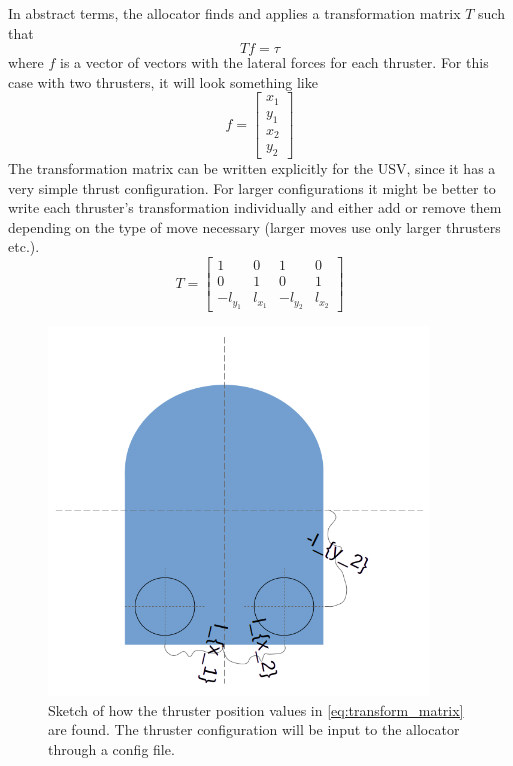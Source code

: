 \documentclass[class=article, crop=false, draft=true]{standalone}
\begin{document}
In abstract terms, the allocator finds and applies a transformation matrix \(T\) such that \[Tf = \tau\] where \(f\) is a vector of vectors with the lateral forces for each thruster. For this case with two thrusters, it will look something like \[f = \begin{bmatrix}x_1 \\ y_1 \\ x_2 \\ y_2 \end{bmatrix}\]
The transformation matrix can be written explicitly for the USV, since it has a very simple thrust configuration. For larger configurations it might be better to write each thruster's transformation individually and either add or remove them depending on the type of move necessary (larger moves use only larger thrusters etc.).
\begin{equation}\label{eq:transform_matrix}
T = \begin{bmatrix}1 & 0 & 1 & 0 \\ 0 & 1 & 0 & 1 \\ -l_{y_1} & l_{x_1} & -l_{y_2} & l_{x_2}\end{bmatrix}
\end{equation}

\begin{figure}
    \centering
    \includegraphics[width=0.9\textwidth]{thruster_position_sketch}
    \caption{Sketch of how the thruster position values in \cref{eq:transform_matrix} are found. The thruster configuration will be input to the allocator through a config file.}
    \label{fig:thruster_position_sketch}
\end{figure}
\end{document}
